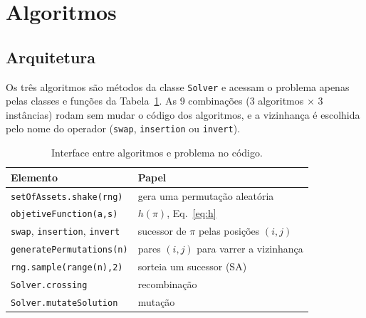 \section{Algoritmos}\label{sec:algoritmos}

\subsection{Arquitetura}

Os três algoritmos são métodos da classe \texttt{Solver} e acessam o problema apenas pelas classes e funções da Tabela~\ref{tab:interface}. As 9 combinações (3 algoritmos $\times$ 3 instâncias) rodam sem mudar o código dos algoritmos, e a vizinhança é escolhida pelo nome do operador (\texttt{swap}, \texttt{insertion} ou \texttt{invert}).

\begin{table}[H]
\centering
\caption{Interface entre algoritmos e problema no código.}
\label{tab:interface}
\small
\begin{tabular}{p{3.9cm}p{3.9cm}}
\toprule
Elemento & Papel\\
\midrule
\texttt{setOfAssets.shake(rng)} & gera uma permutação aleatória\\
\texttt{objetiveFunction(a,s)} & $h(\pi)$, Eq.~\eqref{eq:h}\\
\texttt{swap}, \texttt{insertion}, \texttt{invert} & sucessor de $\pi$ pelas posições $(i,j)$\\
\texttt{generatePermutations(n)} & pares $(i,j)$ para varrer a vizinhança\\
\texttt{rng.sample(range(n),2)} & sorteia um sucessor (SA)\\
\texttt{Solver.crossing} & recombinação\\
\texttt{Solver.mutateSolution} & mutação\\
\bottomrule
\end{tabular}
\end{table}

